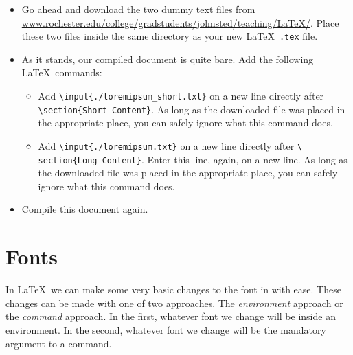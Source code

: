 \begin{itemize}
{\begin{minipage}{\linewidth}
\begin{verbatim}
\end{verbatim}
    \end{minipage}
  }
\item Go ahead and download the two dummy text files from
  \url{www.rochester.edu/college/gradstudents/jolmsted/teaching/LaTeX/}. Place
  these two files inside the same directory as your new
  \LaTeX~\texttt{.tex} file.
\item As it stands, our compiled document is quite bare. Add the
  following \LaTeX~commands:
  \begin{itemize}
  \item Add \texttt{\textbackslash input\{./loremipsum\_short.txt\}}
    on a new line directly after \texttt{\textbackslash section\{Short
      Content\}}. As long as the downloaded file was placed in the
    appropriate place, you can safely ignore what this command does.
  \item Add \texttt{\textbackslash input\{./loremipsum.txt\}} on a new
    line directly after \texttt{\textbackslash
      section\{Long~Content\}}. Enter this line, again, on a new
    line. As long as the downloaded file was placed in the appropriate
    place, you can safely ignore what this command does.
  \end{itemize}
\item Compile this document again.
\end{itemize}

\section{Fonts}
In \LaTeX~we can make some very basic changes to the font in with
ease. These changes can be made with one of two approaches. The
\textit{environment} approach or the \textit{command} approach. In the
first, whatever font we change will be inside an environment. In the
second, whatever font we change will be the mandatory argument to a
command.

